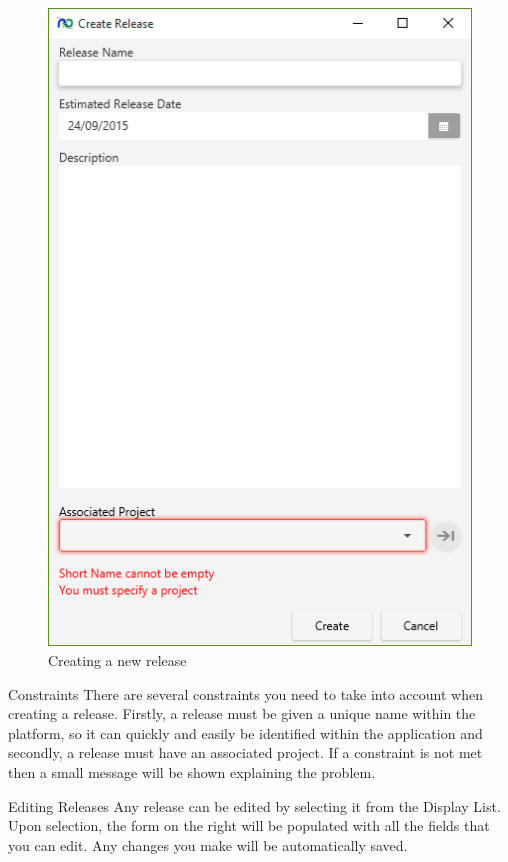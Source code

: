 \begin{figure}[H]
\centering
\includegraphics[width=\textwidth]{images/screenshots/releases3.PNG}
\caption{Creating a new release}
\label{fig:new_project}
\end{figure}

Constraints
\newline
There are several constraints you need to take into account when creating a release. Firstly, a release must be given a unique name within the platform, so it can quickly and easily be identified within the application and secondly, a release must have an associated project. If a constraint is not met then a small message will be shown explaining the problem.

Editing Releases
\newline
Any release can be edited by selecting it from the Display List. Upon selection, the form on the right will be populated with all the fields that you can edit. Any changes you make will be automatically saved.

